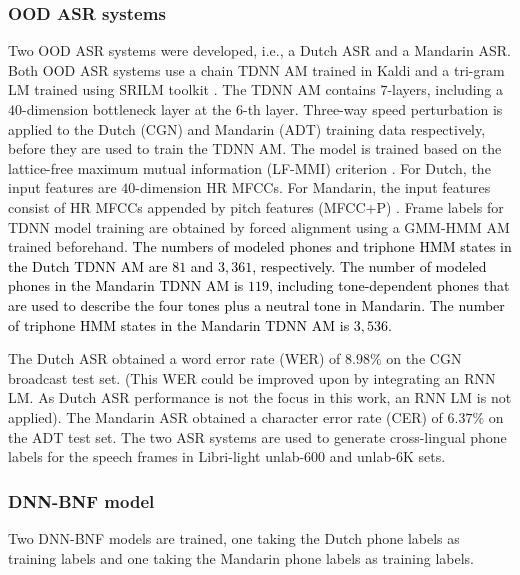 \documentclass[transmag]{IEEEtran}
\begin{document}
\subsubsection{OOD ASR systems}
\label{subsubsec:expsetup_backend_ood}
Two OOD ASR systems were developed, i.e., a Dutch ASR and a Mandarin ASR. Both OOD ASR systems use a chain TDNN AM trained in Kaldi \cite{povey2011kaldi}  and a tri-gram LM trained using SRILM toolkit \cite{Stolcke02srilm--}. The TDNN AM contains $7$-layers, including a $40$-dimension bottleneck layer at the $6$-th layer. Three-way speed perturbation \cite{ko2015audio} is applied to the Dutch (CGN) and Mandarin (ADT) training data respectively, before they are used to train the TDNN AM.
The model is trained based on the lattice-free maximum mutual information (LF-MMI) criterion \cite{povey2016purely}. For Dutch, the input features are $40$-dimension HR MFCCs. For Mandarin, the input features consist of HR MFCCs appended by pitch features (MFCC+P) \cite{ghahremani2014pitch}. Frame labels for TDNN model training are obtained by forced alignment using a GMM-HMM AM trained beforehand. 
\textcolor{black}{The numbers of modeled 
phones and triphone HMM states in the Dutch TDNN AM are $81$ and $3,361$, respectively. The number of modeled phones in the Mandarin TDNN AM is $119$,  including tone-dependent phones that are used to describe the four tones plus a neutral tone in Mandarin. The number of   triphone HMM states in the Mandarin TDNN AM is $3,536$.}

The Dutch ASR obtained a word error rate (WER) of $8.98\%$ on the CGN broadcast test set. (This WER could be improved upon by integrating an RNN LM. As Dutch ASR performance is not the focus in this work, an RNN LM is not applied). The Mandarin ASR obtained a character error rate (CER) of $6.37\%$ on the ADT test set. The two ASR systems are used to generate cross-lingual phone labels for the speech frames in Libri-light unlab-600 and unlab-6K sets.
\subsubsection{DNN-BNF model}
\label{subsubsec:expsetup_backend_dnn_bnf}
Two DNN-BNF models are trained, one taking the Dutch phone labels as training labels and one taking the Mandarin phone labels as training labels.
\end{document}
